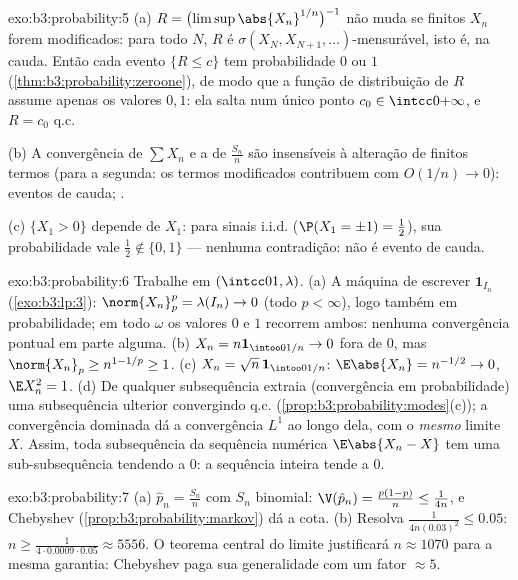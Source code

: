 \begin{solution}{exo:b3:probability:5}
(a) $R = \bigl(\limsup\abs{X_n}^{1/n}\bigr)^{-1}$ não muda
se finitos $X_n$ forem modificados: para todo $N$,
$R$ é $\sigma(X_N, X_{N+1}, \dots)$-mensurável, isto é,
 na cauda. Então cada evento $\{R \leq c\}$ tem
probabilidade $0$ ou $1$ (\cref{thm:b3:probability:zeroone}),
de modo que a função de distribuição de $R$ assume apenas os valores
$0, 1$: ela salta num único ponto $c_0 \in
\intcc0{+\infty}$, e $R = c_0$ q.c.

(b) A convergência de $\sum X_n$ e a de $\frac{S_n}n$ são
insensíveis à alteração de finitos termos (para a segunda:
os termos modificados contribuem com $O(1/n) \to 0$): eventos de cauda;
.

(c) $\{X_1 > 0\}$ depende de $X_1$: para sinais i.i.d.
($\P(X_1 = \pm1) = \frac12$), sua probabilidade vale $\frac12
\notin \{0,1\}$ --- nenhuma contradição: não é evento de
cauda.
\end{solution}

\begin{solution}{exo:b3:probability:6}
Trabalhe em $(\intcc01, \lambda)$.
(a) A máquina de escrever $\mathbf 1_{I_n}$
(\cref{exo:b3:lp:3}): $\norm{X_n}_p^p = \lambda(I_n) \to 0$
(todo $p < \infty$), logo também em probabilidade; em todo
$\omega$ os valores $0$ e $1$ recorrem ambos: nenhuma convergência
pontual em parte alguma.
(b) $X_n = n\mathbf 1_{\intoo0{1/n}} \to 0$ fora de $0$, mas
$\norm{X_n}_p \geq n^{1 - 1/p} \geq 1$.
(c) $X_n = \sqrt n\,\mathbf 1_{\intoo0{1/n}}$: $\E\abs{X_n} =
n^{-1/2} \to 0$, $\E X_n^2 = 1$.
(d) De qualquer subsequência extraia (convergência em
probabilidade) uma subsequência ulterior convergindo q.c.
(\cref{prop:b3:probability:modes}(c)); a convergência dominada
dá a convergência $L^1$ ao longo dela, com o \emph{mesmo} limite
$X$. Assim, toda subsequência da sequência numérica
$\E\abs{X_n - X}$ tem uma sub-subsequência tendendo a $0$: a
sequência inteira tende a $0$.
\end{solution}

\begin{solution}{exo:b3:probability:7}
(a) $\hat p_n = \frac{S_n}n$ com $S_n$ binomial: $\V(\hat
p_n) = \frac{p(1-p)}n \leq \frac1{4n}$, e Chebyshev
(\cref{prop:b3:probability:markov}) dá a cota.
(b) Resolva $\frac1{4n(0.03)^2} \leq 0.05$: $n \geq
\frac{1}{4\cdot0.0009\cdot0.05} \approx 5556$. O teorema
central do limite justificará $n \approx 1070$ para a mesma
garantia: Chebyshev paga sua generalidade com um fator
$\approx 5$.
\end{solution}

